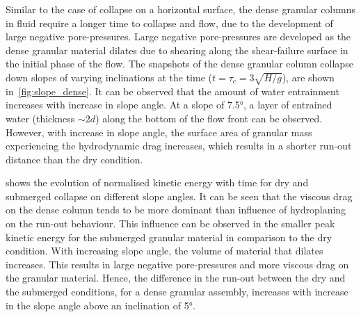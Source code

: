 Similar to the case of collapse on a horizontal surface, the dense granular 
columns in fluid require a longer time to collapse and flow, due to the 
development of large negative pore-pressures. Large negative pore-pressures are 
developed as the dense granular material dilates due to shearing along the 
shear-failure surface in the initial phase of the flow. The snapshots of the 
dense granular column collapse down slopes of varying inclinations at the time 
($t=\tau_{c}=3\sqrt{H/g}$), are shown in~\cref{fig:slope_dense}. It can be 
observed that the amount of water entrainment increases with increase in slope 
angle. At a slope of 7.5\si{\degree}, a layer of entrained water (thickness 
$\sim 2d$) along the bottom of the flow front can be observed. However, with 
increase in slope angle, the surface area of granular mass experiencing the 
hydrodynamic drag increases, which results in a shorter run-out distance than 
the dry condition.

 shows the evolution of normalised kinetic energy 
with time for dry and submerged collapse on different slope angles. It can be 
seen that the viscous drag on the dense column tends to be more dominant than 
influence of hydroplaning on the run-out behaviour. This influence can be 
observed in the smaller peak kinetic energy 
for the submerged granular material in comparison to the dry condition. With 
increasing slope angle, the volume of material that dilates increases. 
This results in large negative pore-pressures and more viscous drag on the 
granular material. Hence, the difference in the run-out between the dry and the 
submerged 
conditions, for a dense granular assembly, increases with increase in the slope 
angle above an inclination of 5\si{\degree}.


